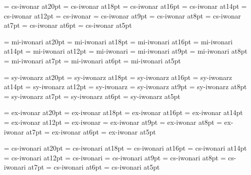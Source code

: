 

\font\twentyrm=     cs-iwonar at20pt
\font\eighteenrm=   cs-iwonar at18pt
\font\sixteenrm=    cs-iwonar at16pt
\font\fourteenrm=   cs-iwonar at14pt
\font\twelverm=     cs-iwonar at12pt
\font\tenrm=        cs-iwonar
\font\ninerm=       cs-iwonar at9pt
\font\eightrm=      cs-iwonar at8pt
\font\sevenrm=      cs-iwonar at7pt
\font\sixrm=        cs-iwonar at6pt
\font\fiverm=       cs-iwonar at5pt

\font\twentyi=      mi-iwonari at20pt
\font\eighteeni=    mi-iwonari at18pt
\font\sixteeni=     mi-iwonari at16pt
\font\fourteeni=    mi-iwonari at14pt
\font\twelvei=      mi-iwonari at12pt
\font\teni=         mi-iwonari
\font\ninei=        mi-iwonari at9pt
\font\eighti=       mi-iwonari at8pt
\font\seveni=       mi-iwonari at7pt
\font\sixi=         mi-iwonari at6pt
\font\fivei=        mi-iwonari at5pt

\font\twentysy=     sy-iwonarz at20pt
\font\eighteensy=   sy-iwonarz at18pt
\font\sixteensy=    sy-iwonarz at16pt
\font\fourteensy=   sy-iwonarz at14pt
\font\twelvesy=     sy-iwonarz at12pt
\font\tensy=        sy-iwonarz
\font\ninesy=       sy-iwonarz at9pt
\font\eightsy=      sy-iwonarz at8pt
\font\sevensy=      sy-iwonarz at7pt
\font\sixsy=        sy-iwonarz at6pt
\font\fivesy=       sy-iwonarz at5pt

\font\twentyex=     ex-iwonar at20pt
\font\eighteenex=   ex-iwonar at18pt
\font\sixteenex=    ex-iwonar at16pt
\font\fourteenex=   ex-iwonar at14pt
\font\twelveex=     ex-iwonar at12pt
\font\tenex=        ex-iwonar
\font\nineex=       ex-iwonar at9pt
\font\eightex=      ex-iwonar at8pt
\font\sevenex=      ex-iwonar at7pt
\font\sixex=        ex-iwonar at6pt
\font\fiveex=       ex-iwonar at5pt

\font\twentyit=     cs-iwonari at20pt
\font\eighteenit=   cs-iwonari at18pt
\font\sixteenit=    cs-iwonari at16pt
\font\fourteenit=   cs-iwonari at14pt
\font\twelveit=     cs-iwonari at12pt
\font\tenit=        cs-iwonari
\font\nineit=       cs-iwonari at9pt
\font\eightit=      cs-iwonari at8pt
\font\sevenit=      cs-iwonari at7pt
\font\sixit=        cs-iwonari at6pt
\font\fiveit=       cs-iwonari at5pt

